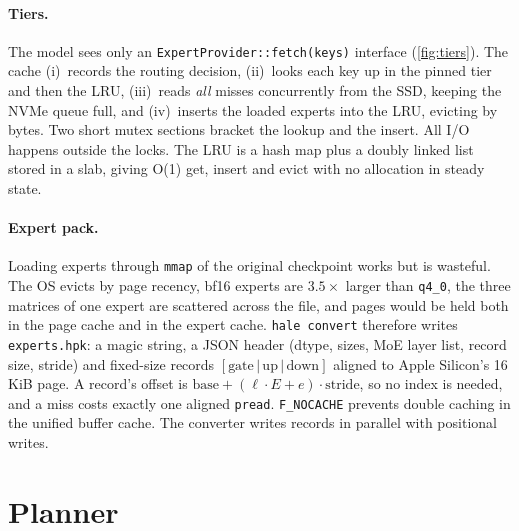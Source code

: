 \documentclass[11pt]{article}
\begin{document}
\paragraph{Tiers.} The model sees only an \texttt{ExpertProvider::fetch(keys)} interface
(\cref{fig:tiers}). The cache (i)~records the routing decision, (ii)~looks each key up in the
pinned tier and then the LRU, (iii)~reads \emph{all} misses concurrently from the SSD, keeping
the NVMe queue full, and (iv)~inserts the loaded experts into the LRU, evicting by bytes. Two
short mutex sections bracket the lookup and the insert. All I/O happens outside the locks.
The LRU is a hash map plus a doubly linked list stored in a slab, giving O(1) get, insert
and evict with no allocation in steady state.

\paragraph{Expert pack.} Loading experts through \texttt{mmap} of the original checkpoint works
but is wasteful. The OS evicts by page recency, bf16 experts are $3.5\times$ larger than
\texttt{q4\_0}, the three matrices of one expert are scattered across the file, and pages would
be held both in the page cache and in the expert cache. \texttt{hale convert} therefore writes
\texttt{experts.hpk}: a magic string, a JSON header (dtype, sizes, MoE layer list, record size,
stride) and fixed-size records $[\text{gate}\,|\,\text{up}\,|\,\text{down}]$ aligned to
Apple Silicon's 16\,KiB page. A record's offset is
$\text{base} + (\ell\cdot E + e)\cdot\text{stride}$, so no index is needed, and a miss costs
exactly one aligned \texttt{pread}. \texttt{F\_NOCACHE} prevents double caching in the unified
buffer cache. The converter writes records in parallel with positional writes.

\section{Planner}
\label{sec:planner}
\end{document}
